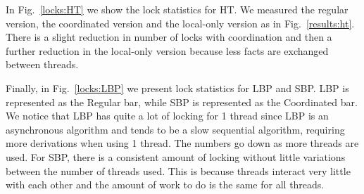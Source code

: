 In Fig.~\ref{locks:HT} we show the lock statistics for HT. We measured the
regular version, the coordinated version and the local-only version as in
Fig.~\ref{results:ht}. There is a slight reduction in number of locks with
coordination and then a further reduction in the local-only version because less
facts are exchanged between threads.

\begin{topfig}
   \begin{center}
   \end{center}
\end{topfig}

Finally, in Fig.~\ref{locks:LBP} we present lock statistics for LBP and SBP. LBP
is represented as the Regular bar, while SBP is represented as the Coordinated
bar. We notice that LBP has quite a lot of locking for 1 thread since LBP
is an asynchronous algorithm and tends to be a slow sequential algorithm,
requiring more derivations when using 1 thread. The numbers go down as more
threads are used. For SBP, there is a consistent amount of locking without
little variations between the number of threads used. This is because threads
interact very little with each other and the amount of work to do is the same
for all threads.

\begin{topfig}
   \begin{center}
   \end{center}
\end{topfig}

